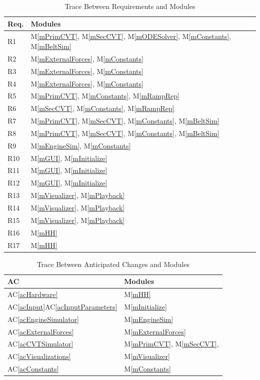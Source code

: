 \documentclass[12pt, titlepage]{article}
\newcommand{\acref}[1]{AC\ref{#1}}
\newcommand{\mref}[1]{M\ref{#1}}
\begin{document}
\begin{table}[H]
\centering
\begin{tabular}{p{} p{}}
\toprule
\textbf{Req.} & \textbf{Modules}\\
\midrule
R1 & \mref{mPrimCVT}, \mref{mSecCVT}, \mref{mODESolver}, \mref{mConstants}, \mref{mBeltSim}\\
R2 & \mref{mExternalForces}, \mref{mConstants}\\
R3 & \mref{mExternalForces}, \mref{mConstants}\\
R4 & \mref{mExternalForces}, \mref{mConstants}\\
R5 & \mref{mPrimCVT}, \mref{mConstants}, \mref{mRampRep}\\
R6 & \mref{mSecCVT}, \mref{mConstants}, \mref{mRampRep}\\
R7 & \mref{mPrimCVT}, \mref{mSecCVT}, \mref{mConstants}, \mref{mBeltSim}\\
R8 & \mref{mPrimCVT}, \mref{mSecCVT}, \mref{mConstants}, \mref{mBeltSim}\\
R9 & \mref{mEngineSim}, \mref{mConstants}\\
R10 & \mref{mGUI}, \mref{mInitialize}\\
R11 & \mref{mGUI}, \mref{mInitialize}\\
R12 & \mref{mGUI}, \mref{mInitialize}\\
R13 & \mref{mVisualizer}, \mref{mPlayback}\\
R14 & \mref{mVisualizer}, \mref{mPlayback}\\
R15 & \mref{mVisualizer}, \mref{mPlayback}\\
R16 & \mref{mHH}\\
R17 & \mref{mHH}\\
\bottomrule
\end{tabular}
\caption{Trace Between Requirements and Modules}
\label{TblRT}
\end{table}

\begin{table}[H]
\centering
\begin{tabular}{p{} p{}}
\toprule
\textbf{AC} & \textbf{Modules}\\
\midrule
\acref{acHardware} & \mref{mHH}\\
\acref{acInput}\acref{acInputParameters} & \mref{mInitialize}\\
\acref{acEngineSimulator} & \mref{mEngineSim}\\
\acref{acExternalForces} & \mref{mExternalForces}\\
\acref{acCVTSimulator} & \mref{mPrimCVT}, \mref{mSecCVT},\\
\acref{acVisualizations} & \mref{mVisualizer}\\
\acref{acConstants} & \mref{mConstants}\\

\bottomrule
\end{tabular}
\caption{Trace Between Anticipated Changes and Modules}
\label{TblACT}
\end{table}
\end{document}
